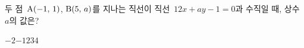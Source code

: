 두 점~$\mathrm{A}(-1,\,1)$, $\mathrm{B}(5,\,a)$를 지나는 직선이 직선~$12x+ay-1=0$과 수직일 때, 상수 $a$의 값은? 
\begin{choices32}{$-2$}{$-1$}{$2$}{$3$}{$4$}\end{choices32}
